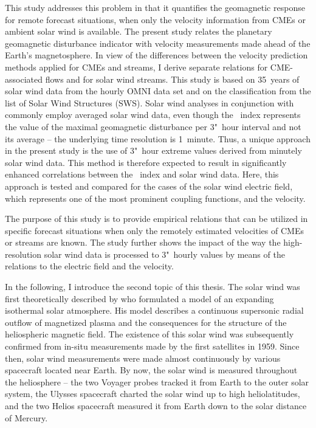 This study addresses this problem in that it quantifies the geomagnetic response for remote forecast situations, when only the velocity information from CMEs or ambient solar wind is available.
The present study relates the planetary geomagnetic disturbance indicator \Kp{} with velocity measurements made ahead of the Earth's magnetosphere. In view of the differences between the velocity prediction methods applied for CMEs and streams, I derive separate relations for CME-associated flows and for solar wind streams. This study is based on 35~years of solar wind data from the hourly OMNI data set and on the classification from the list of Solar Wind Structures (SWS).
Solar wind analyses in conjunction with \Kp{} commonly employ averaged solar wind data, even though the \Kp~index represents the value of the maximal geomagnetic disturbance per 3"~hour interval and not its average -- the underlying time resolution is 1~minute. Thus, a unique approach in the present study is the use of 3"~hour extreme values derived from minutely solar wind data. This method is therefore expected to result in significantly enhanced correlations between the \Kp~index and solar wind data. Here, this approach is tested and compared for the cases of the solar wind electric field, which represents one of the most prominent coupling functions, and the velocity.

The purpose of this study is to provide empirical \Kp{} relations that can be utilized in specific forecast situations when only the remotely estimated velocities of CMEs or streams are known.
The study further shows the impact of the way the high-resolution solar wind data is processed to 3"~hourly values by means of the \Kp{} relations to the electric field and the velocity.

\bigskip

In the following, I introduce the second topic of this thesis.
The solar wind was first theoretically described by \citet{Parker1958} who formulated a model of an expanding isothermal solar atmosphere. His model describes a continuous supersonic radial outflow of magnetized plasma and the consequences for the structure of the heliospheric magnetic field. The existence of this solar wind was subsequently confirmed from in-situ measurements made by the first satellites in 1959. Since then, solar wind measurements were made almost continuously by various spacecraft located near Earth. By now, the solar wind is measured throughout the heliosphere -- the two Voyager probes tracked it from Earth to the outer solar system, the Ulysses spacecraft charted the solar wind up to high heliolatitudes, and the two Helios spacecraft measured it from Earth down to the solar distance of Mercury.

